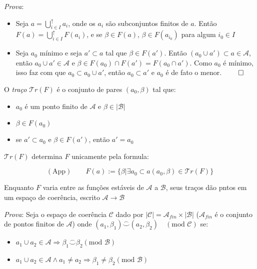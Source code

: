 \documentclass[../main.tex]{subfiles}
\begin{document}
\emph{Prova}:
\begin{itemize}
    \item Seja $a = \bigcup^{\uparrow}_{i \in I} a_i$, onde os $a_i$ são subconjuntos finitos de $a$. Então $F(a) = \bigcup^{\uparrow}_{i \in I} F(a_i)$, e se $\beta \in F(a)$, $\beta \in F(a_{i_0})$ para algum $i_0 \in I$
    \item Seja $a_0$ mínimo e seja $a' \subset a$ tal que $\beta \in F(a')$. Então $(a_0 \cup a') \subset a \in \mathcal{A}$, então $a_0 \cup a' \in \mathcal{A}$ e $\beta \in F(a_0) \cap F(a') = F(a_0 \cap a')$. Como $a_0$ é mínimo, isso faz com que $a_0 \subset a_0 \cup a'$, então $a_0 \subset a'$ e $a_0$ é de fato o menor. $\qed$
\end{itemize}

\begin{definition}
    O \emph{traço} $\mathcal{T}r(F)$ é o conjunto de pares $(a_0, \beta)$ tal que:
    \begin{itemize}
        \item $a_0$ é um ponto finito de $\mathcal{A}$ e $\beta \in |\mathcal{B}|$
        \item $\beta \in F(a_0)$
        \item se $a' \subset a_0$ e $\beta \in F(a')$, então $a' = a_0$
    \end{itemize}
\end{definition}

$\mathcal{T}r(F)$ determina $F$ unicamente pela formula:

$$(\text{App}) \qquad F(a) := \{\beta | \exists a_0 \subset a (a_0, \beta) \in \mathcal{T}r(F)\}$$

\begin{proposition}
    Enquanto $F$ varia entre as funções estáveis de $\mathcal{A}$ a $\mathcal{B}$, seus traços dão pntos em um espaço de coerência, escrito $\mathcal{A} \to \mathcal{B}$
\end{proposition}

\emph{Prova}: Seja o espaço de coerência $\mathcal{C}$ dado por $|\mathcal{C}| = \mathcal{A}_{fin} \times |\mathcal{B}|$ ($\mathcal{A}_{fin}$ é o conjunto de pontos finitos de $\mathcal{A}$) onde $(a_1, \beta_1) \stackrel{\frown}{\smile} (a_2, \beta_2) \quad (\text{mod } \mathcal{C})$ se:
\begin{itemize}
    \item $a_1 \cup a_2 \in \mathcal{A} \Rightarrow \beta_1 \stackrel{\frown}{\smile} \beta_2 (\text{mod } \mathcal{B})$
    \item $a_1 \cup a_2 \in \mathcal{A} \land a_1 \neq a_2 \Rightarrow \beta_1 \neq \beta_2 (\text{mod } \mathcal{B})$
\end{itemize}
\end{document}
